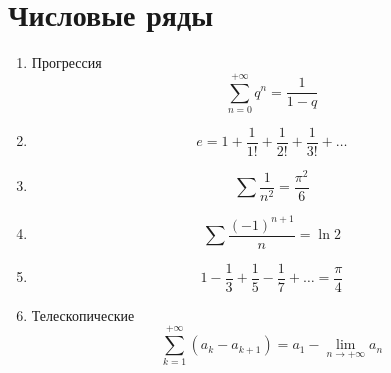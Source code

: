\documentclass{article}
\begin{document}
\section{Числовые ряды}
\label{sec:org1beadf9}
\begin{enumerate}
\item Прогрессия
\[ \sum_{n = 0}^{+\infty} q^n = \frac{1}{1 - q} \]
\item \[ e = 1 + \frac{1}{1!} + \frac{1}{2!} + \frac{1}{3!} + \dots \]
\item \[ \sum \frac{1}{n^2} = \frac{\pi^2}{6} \]
\item \[ \sum \frac{(-1)^{n + 1}}{n} = \ln 2 \]
\item \[ 1 - \frac{1}{3} + \frac{1}{5} - \frac{1}{7} + \dots = \frac{\pi}{4} \]
\item Телескопические
\[ \sum_{k = 1}^{+\infty} (a_k - a_{k + 1}) = a_1 - \lim_{n \to +\infty} a_n \]
\end{enumerate}
\end{document}
